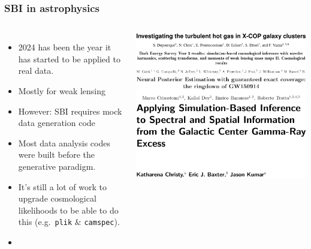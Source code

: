 \documentclass[aspectratio=169]{beamer}
\begin{document}
\begin{frame}
    \frametitle{SBI in astrophysics}
    \begin{columns}
        \begin{itemize}
            \item 2024 has been the year it has started to be applied to real data.
            \item Mostly for weak lensing
            \item However: SBI requires mock data generation code
            \item Most data analysis codes were built before the generative paradigm.
            \item It's still a lot of work to upgrade cosmological likelihoods  to be able to do this (e.g.\ \texttt{plik} \& \texttt{camspec}).
            \item {}
        \end{itemize}
        \includegraphics[width=\textwidth]{figures/sbi_papers/clusters.pdf}
        \vspace{10pt}\\
        \includegraphics[width=\textwidth]{figures/sbi_papers/des.pdf}
        \vspace{10pt}\\
        \includegraphics[width=\textwidth]{figures/sbi_papers/gw.pdf}
        \vspace{10pt}\\
        \includegraphics[width=\textwidth]{figures/sbi_papers/center.pdf}

\end{columns}
\end{frame}
\end{document}
